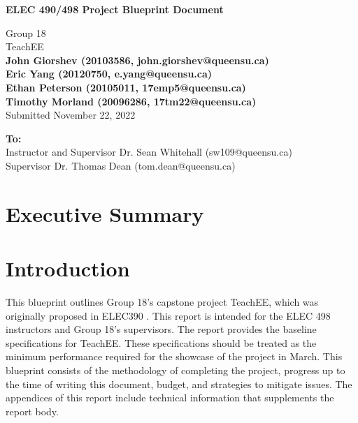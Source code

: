 \documentclass[letterpaper,12pt]{article}
\begin{document}
\begin{titlepage}
    \begin{center}
        \vspace*{1cm}

        \Large
        \textbf{ELEC 490/498 Project Blueprint Document}

        \vspace{0.5cm}
        Group 18\\
        TeachEE\\
        \vspace{0.5cm}
        \normalsize
        \textbf{John Giorshev (20103586, john.giorshev@queensu.ca) \\ Eric Yang (20120750, e.yang@queensu.ca) \\ Ethan Peterson (20105011, 17emp5@queensu.ca) \\ Timothy Morland (20096286, 17tm22@queensu.ca)}\\
        \vspace{0.5cm}
        Submitted November 22, 2022\\

        \vfill
            
        \textbf{To:}\\
        Instructor and Supervisor Dr. Sean Whitehall (sw109@queensu.ca) \\
        Supervisor Dr. Thomas Dean (tom.dean@queensu.ca) \\
            
        \vspace{1.8cm}

    \end{center}
\end{titlepage}
\section*{Executive Summary}
\newpage

\tableofcontents
\listoffigures
\listoftables
\newpage
{}
\section{Introduction} \label{sec:intro} %
This blueprint outlines Group 18's capstone project TeachEE, which was
originally proposed in ELEC390 \cite{prop_390}. This report is intended for the
ELEC 498 instructors and Group 18's supervisors. The report provides the
baseline specifications for TeachEE. These specifications should be treated as
the minimum performance required for the showcase of the project in March. This
blueprint consists of the methodology of completing the project, progress up to
the time of writing this document, budget, and strategies to mitigate issues.
The appendices of this report include technical information that supplements the
report body.
\end{document}
